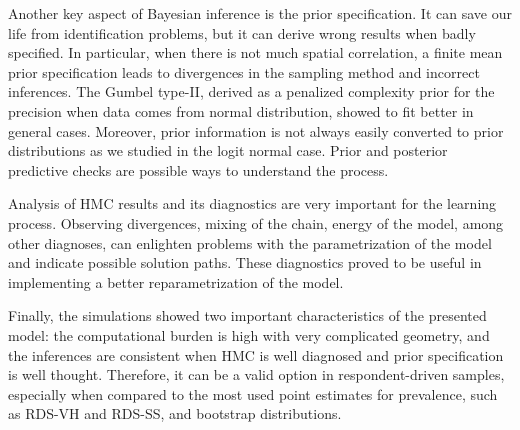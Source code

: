 Another key aspect of Bayesian inference is the prior specification. It can save our life from identification problems, but it can derive wrong results when badly specified. In particular, when there is not much spatial correlation, a finite mean prior specification leads to divergences in the sampling method and incorrect inferences. The Gumbel type-II, derived as a penalized complexity prior for the precision when data comes from normal distribution, showed to fit better in general cases. Moreover, prior information is not always easily converted to prior distributions as we studied in the logit normal case. Prior and posterior predictive checks are possible ways to understand the process. 

Analysis of HMC results and its diagnostics are very important for the learning process. Observing divergences, mixing of the chain, energy of the model, among other diagnoses, can enlighten problems with the parametrization of the model and indicate possible solution paths. These diagnostics proved to be useful in implementing a better reparametrization of the model.

Finally, the simulations showed two important characteristics of the presented
model: the computational burden is high with very complicated geometry, and
the inferences are consistent when HMC is well diagnosed and prior
specification is well thought. Therefore, it can be a valid option in
respondent-driven samples, especially when compared to the most used point
estimates for prevalence, such as RDS-VH and RDS-SS, and bootstrap
distributions.  